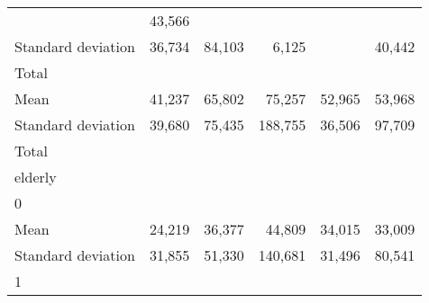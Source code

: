 \begin{tabular}{llllll}
  \multicolumn{1}{r}{} &
  \multicolumn{1}{r}{43,566} \\
\multicolumn{1}{l}{\hspace{4em}Standard deviation} &
  \multicolumn{1}{|r}{36,734} &
  \multicolumn{1}{r}{84,103} &
  \multicolumn{1}{r}{6,125} &
  \multicolumn{1}{r}{} &
  \multicolumn{1}{r}{40,442} \\
\multicolumn{1}{l}{\hspace{3em}Total} &
  \multicolumn{1}{|r}{} &
  \multicolumn{1}{r}{} &
  \multicolumn{1}{r}{} &
  \multicolumn{1}{r}{} &
  \multicolumn{1}{r}{} \\
\multicolumn{1}{l}{\hspace{4em}Mean} &
  \multicolumn{1}{|r}{41,237} &
  \multicolumn{1}{r}{65,802} &
  \multicolumn{1}{r}{75,257} &
  \multicolumn{1}{r}{52,965} &
  \multicolumn{1}{r}{53,968} \\
\multicolumn{1}{l}{\hspace{4em}Standard deviation} &
  \multicolumn{1}{|r}{39,680} &
  \multicolumn{1}{r}{75,435} &
  \multicolumn{1}{r}{188,755} &
  \multicolumn{1}{r}{36,506} &
  \multicolumn{1}{r}{97,709} \\
\multicolumn{1}{l}{\hspace{1em}Total} &
  \multicolumn{1}{|r}{} &
  \multicolumn{1}{r}{} &
  \multicolumn{1}{r}{} &
  \multicolumn{1}{r}{} &
  \multicolumn{1}{r}{} \\
\multicolumn{1}{l}{\hspace{2em}elderly} &
  \multicolumn{1}{|r}{} &
  \multicolumn{1}{r}{} &
  \multicolumn{1}{r}{} &
  \multicolumn{1}{r}{} &
  \multicolumn{1}{r}{} \\
\multicolumn{1}{l}{\hspace{3em}0} &
  \multicolumn{1}{|r}{} &
  \multicolumn{1}{r}{} &
  \multicolumn{1}{r}{} &
  \multicolumn{1}{r}{} &
  \multicolumn{1}{r}{} \\
\multicolumn{1}{l}{\hspace{4em}Mean} &
  \multicolumn{1}{|r}{24,219} &
  \multicolumn{1}{r}{36,377} &
  \multicolumn{1}{r}{44,809} &
  \multicolumn{1}{r}{34,015} &
  \multicolumn{1}{r}{33,009} \\
\multicolumn{1}{l}{\hspace{4em}Standard deviation} &
  \multicolumn{1}{|r}{31,855} &
  \multicolumn{1}{r}{51,330} &
  \multicolumn{1}{r}{140,681} &
  \multicolumn{1}{r}{31,496} &
  \multicolumn{1}{r}{80,541} \\
\multicolumn{1}{l}{\hspace{3em}1} &
  \multicolumn{1}{|r}{} &

\end{tabular}
